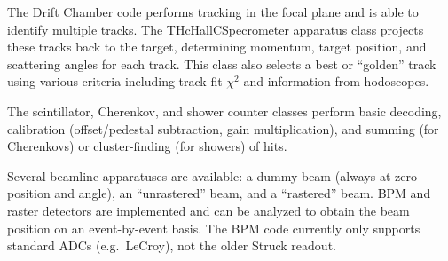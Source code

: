 {{The Drift Chamber code performs tracking in the focal plane and is able to
identify multiple tracks.  The THcHallCSpecrometer apparatus class
projects these tracks back to the target, determining momentum, target
position, and scattering angles for each track.  This class also
selects a best or ``golden'' track using various criteria including
track fit $\chi^2$ and information from hodoscopes.

The scintillator, Cherenkov, and shower counter classes perform basic decoding,
calibration (offset/pedestal subtraction, gain multiplication), and summing 
(for Cherenkovs) or cluster-finding (for showers) of hits. 

Several beamline apparatuses are available: a dummy beam (always at zero 
position and angle), an ``unrastered'' beam, and a ``rastered'' beam. 
BPM and raster detectors are implemented and 
can be analyzed to obtain the beam position
on an event-by-event basis.  The BPM code currently only supports
standard ADCs (e.g.\ LeCroy), not the older Struck readout.


}}
